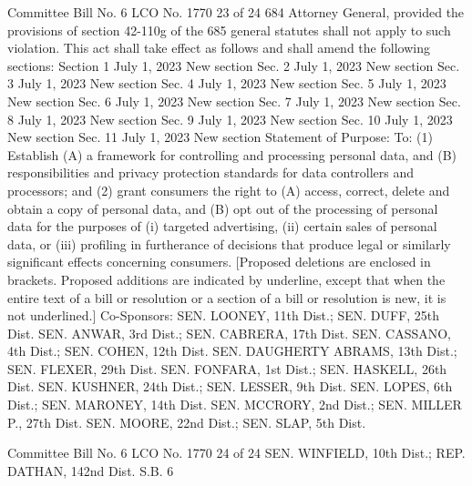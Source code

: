 Committee Bill No. 6
LCO No. 1770 23 of 24
684 Attorney General, provided the provisions of section 42-110g of the
685 general statutes shall not apply to such violation.
This act shall take effect as follows and shall amend the following
sections:
Section 1 July 1, 2023 New section
Sec. 2 July 1, 2023 New section
Sec. 3 July 1, 2023 New section
Sec. 4 July 1, 2023 New section
Sec. 5 July 1, 2023 New section
Sec. 6 July 1, 2023 New section
Sec. 7 July 1, 2023 New section
Sec. 8 July 1, 2023 New section
Sec. 9 July 1, 2023 New section
Sec. 10 July 1, 2023 New section
Sec. 11 July 1, 2023 New section
Statement of Purpose:
To: (1) Establish (A) a framework for controlling and processing
personal data, and (B) responsibilities and privacy protection standards
for data controllers and processors; and (2) grant consumers the right to
(A) access, correct, delete and obtain a copy of personal data, and (B) opt
out of the processing of personal data for the purposes of (i) targeted
advertising, (ii) certain sales of personal data, or (iii) profiling in
furtherance of decisions that produce legal or similarly significant
effects concerning consumers.
[Proposed deletions are enclosed in brackets. Proposed additions are indicated by underline, except
that when the entire text of a bill or resolution or a section of a bill or resolution is new, it is not
underlined.]
Co-Sponsors: SEN. LOONEY, 11th Dist.; SEN. DUFF, 25th Dist.
SEN. ANWAR, 3rd Dist.; SEN. CABRERA, 17th Dist.
SEN. CASSANO, 4th Dist.; SEN. COHEN, 12th Dist.
SEN. DAUGHERTY ABRAMS, 13th Dist.; SEN. FLEXER, 29th
Dist.
SEN. FONFARA, 1st Dist.; SEN. HASKELL, 26th Dist.
SEN. KUSHNER, 24th Dist.; SEN. LESSER, 9th Dist.
SEN. LOPES, 6th Dist.; SEN. MARONEY, 14th Dist.
SEN. MCCRORY, 2nd Dist.; SEN. MILLER P., 27th Dist.
SEN. MOORE, 22nd Dist.; SEN. SLAP, 5th Dist.

Committee Bill No. 6
LCO No. 1770 24 of 24
SEN. WINFIELD, 10th Dist.; REP. DATHAN, 142nd Dist.
S.B. 6 
